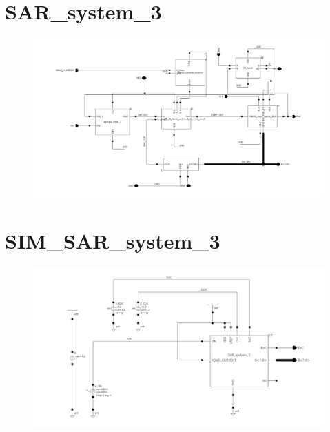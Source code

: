 \documentclass[english, 12pt, a4paper]{ifimaster}
\begin{document}
\begin{appendices}
\section{SAR\_system\_3}
\begin{figure}[!ht]
 \centering
 \includegraphics[width=20cm, angle=90]{img/SAR_system_2_schem}
 \label{app:sar:system:3}
\end{figure}
\newpage
\section{SIM\_SAR\_system\_3}
\begin{figure}[!ht]
 \centering
 \includegraphics[width=20cm, angle=90]{img/SIM_system_2_schem}
 \label{app:SIM:sar:system:3}
\end{figure}

\newpage

\end{appendices}
\end{document}

